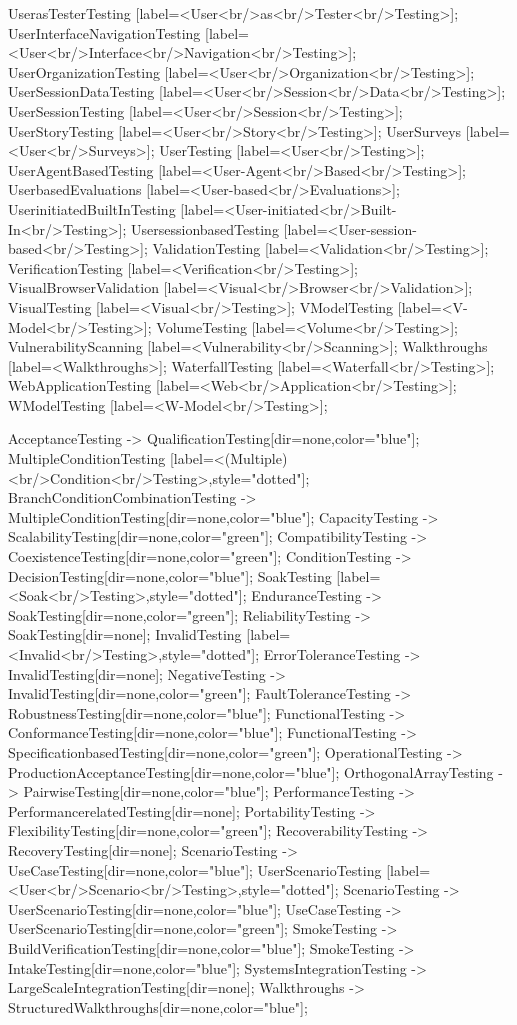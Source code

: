 \documentclass{article}
\begin{document}
{UserasTesterTesting [label=<User<br/>as<br/>Tester<br/>Testing>];
UserInterfaceNavigationTesting [label=<User<br/>Interface<br/>Navigation<br/>Testing>];
UserOrganizationTesting [label=<User<br/>Organization<br/>Testing>];
UserSessionDataTesting [label=<User<br/>Session<br/>Data<br/>Testing>];
UserSessionTesting [label=<User<br/>Session<br/>Testing>];
UserStoryTesting [label=<User<br/>Story<br/>Testing>];
UserSurveys [label=<User<br/>Surveys>];
UserTesting [label=<User<br/>Testing>];
UserAgentBasedTesting [label=<User-Agent<br/>Based<br/>Testing>];
UserbasedEvaluations [label=<User-based<br/>Evaluations>];
UserinitiatedBuiltInTesting [label=<User-initiated<br/>Built-In<br/>Testing>];
UsersessionbasedTesting [label=<User-session-based<br/>Testing>];
ValidationTesting [label=<Validation<br/>Testing>];
VerificationTesting [label=<Verification<br/>Testing>];
VisualBrowserValidation [label=<Visual<br/>Browser<br/>Validation>];
VisualTesting [label=<Visual<br/>Testing>];
VModelTesting [label=<V-Model<br/>Testing>];
VolumeTesting [label=<Volume<br/>Testing>];
VulnerabilityScanning [label=<Vulnerability<br/>Scanning>];
Walkthroughs [label=<Walkthroughs>];
WaterfallTesting [label=<Waterfall<br/>Testing>];
WebApplicationTesting [label=<Web<br/>Application<br/>Testing>];
WModelTesting [label=<W-Model<br/>Testing>];

AcceptanceTesting -> QualificationTesting[dir=none,color="blue"];
MultipleConditionTesting [label=<(Multiple)<br/>Condition<br/>Testing>,style="dotted"];
BranchConditionCombinationTesting -> MultipleConditionTesting[dir=none,color="blue"];
CapacityTesting -> ScalabilityTesting[dir=none,color="green"];
CompatibilityTesting -> CoexistenceTesting[dir=none,color="green"];
ConditionTesting -> DecisionTesting[dir=none,color="blue"];
SoakTesting [label=<Soak<br/>Testing>,style="dotted"];
EnduranceTesting -> SoakTesting[dir=none,color="green"];
ReliabilityTesting -> SoakTesting[dir=none];
InvalidTesting [label=<Invalid<br/>Testing>,style="dotted"];
ErrorToleranceTesting -> InvalidTesting[dir=none];
NegativeTesting -> InvalidTesting[dir=none,color="green"];
FaultToleranceTesting -> RobustnessTesting[dir=none,color="blue"];
FunctionalTesting -> ConformanceTesting[dir=none,color="blue"];
FunctionalTesting -> SpecificationbasedTesting[dir=none,color="green"];
OperationalTesting -> ProductionAcceptanceTesting[dir=none,color="blue"];
OrthogonalArrayTesting -> PairwiseTesting[dir=none,color="blue"];
PerformanceTesting -> PerformancerelatedTesting[dir=none];
PortabilityTesting -> FlexibilityTesting[dir=none,color="green"];
RecoverabilityTesting -> RecoveryTesting[dir=none];
ScenarioTesting -> UseCaseTesting[dir=none,color="blue"];
UserScenarioTesting [label=<User<br/>Scenario<br/>Testing>,style="dotted"];
ScenarioTesting -> UserScenarioTesting[dir=none,color="blue"];
UseCaseTesting -> UserScenarioTesting[dir=none,color="green"];
SmokeTesting -> BuildVerificationTesting[dir=none,color="blue"];
SmokeTesting -> IntakeTesting[dir=none,color="blue"];
SystemsIntegrationTesting -> LargeScaleIntegrationTesting[dir=none];
Walkthroughs -> StructuredWalkthroughs[dir=none,color="blue"];

}
\end{document}
